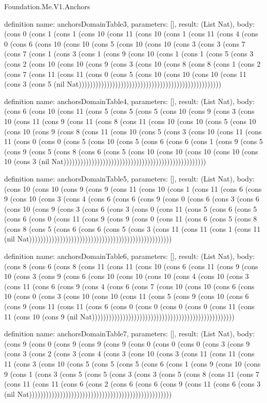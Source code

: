 \begin{lexlean}{Foundation.Me.V1.Anchors}
\begin{semanticmodule}
definition{
  name: anchorsDomainTable3,
  parameters: [],
  result: (List Nat),
  body: (cons 0 (cons 1 (cons 1 (cons 10 (cons 11 (cons 10 (cons 1 (cons 11 (cons 4 (cons 0 (cons 6 (cons 10 (cons 10 (cons 5 (cons 10 (cons 10 (cons 3 (cons 3 (cons 7 (cons 7 (cons 1 (cons 3 (cons 1 (cons 9 (cons 10 (cons 1 (cons 1 (cons 5 (cons 3 (cons 2 (cons 10 (cons 10 (cons 9 (cons 3 (cons 10 (cons 8 (cons 8 (cons 1 (cons 2 (cons 7 (cons 11 (cons 11 (cons 0 (cons 5 (cons 10 (cons 10 (cons 10 (cons 11 (cons 3 (cons 5 (nil Nat)))))))))))))))))))))))))))))))))))))))))))))))))))
}

definition{
  name: anchorsDomainTable4,
  parameters: [],
  result: (List Nat),
  body: (cons 6 (cons 10 (cons 11 (cons 5 (cons 5 (cons 5 (cons 10 (cons 9 (cons 3 (cons 10 (cons 11 (cons 9 (cons 11 (cons 8 (cons 11 (cons 10 (cons 10 (cons 5 (cons 10 (cons 10 (cons 9 (cons 8 (cons 11 (cons 10 (cons 5 (cons 3 (cons 10 (cons 11 (cons 11 (cons 0 (cons 0 (cons 5 (cons 10 (cons 5 (cons 6 (cons 6 (cons 1 (cons 9 (cons 5 (cons 9 (cons 5 (cons 8 (cons 6 (cons 5 (cons 10 (cons 10 (cons 10 (cons 10 (cons 10 (cons 3 (nil Nat)))))))))))))))))))))))))))))))))))))))))))))))))))
}

definition{
  name: anchorsDomainTable5,
  parameters: [],
  result: (List Nat),
  body: (cons 10 (cons 10 (cons 9 (cons 9 (cons 11 (cons 10 (cons 1 (cons 11 (cons 6 (cons 9 (cons 10 (cons 3 (cons 4 (cons 6 (cons 6 (cons 9 (cons 0 (cons 6 (cons 3 (cons 6 (cons 10 (cons 9 (cons 3 (cons 6 (cons 3 (cons 0 (cons 11 (cons 5 (cons 6 (cons 5 (cons 6 (cons 0 (cons 11 (cons 9 (cons 9 (cons 0 (cons 11 (cons 6 (cons 5 (cons 8 (cons 8 (cons 5 (cons 6 (cons 6 (cons 5 (cons 3 (cons 11 (cons 11 (cons 1 (cons 11 (nil Nat)))))))))))))))))))))))))))))))))))))))))))))))))))
}

definition{
  name: anchorsDomainTable6,
  parameters: [],
  result: (List Nat),
  body: (cons 8 (cons 6 (cons 8 (cons 11 (cons 11 (cons 10 (cons 6 (cons 11 (cons 9 (cons 10 (cons 3 (cons 9 (cons 6 (cons 10 (cons 10 (cons 10 (cons 4 (cons 10 (cons 3 (cons 11 (cons 6 (cons 9 (cons 4 (cons 6 (cons 7 (cons 10 (cons 10 (cons 6 (cons 10 (cons 0 (cons 3 (cons 10 (cons 10 (cons 11 (cons 5 (cons 9 (cons 10 (cons 6 (cons 9 (cons 11 (cons 11 (cons 6 (cons 0 (cons 0 (cons 0 (cons 0 (cons 11 (cons 11 (cons 10 (cons 9 (nil Nat)))))))))))))))))))))))))))))))))))))))))))))))))))
}

definition{
  name: anchorsDomainTable7,
  parameters: [],
  result: (List Nat),
  body: (cons 9 (cons 0 (cons 9 (cons 9 (cons 9 (cons 0 (cons 0 (cons 0 (cons 3 (cons 9 (cons 3 (cons 2 (cons 3 (cons 4 (cons 3 (cons 10 (cons 3 (cons 11 (cons 11 (cons 11 (cons 3 (cons 10 (cons 5 (cons 5 (cons 5 (cons 6 (cons 1 (cons 9 (cons 10 (cons 9 (cons 1 (cons 3 (cons 5 (cons 5 (cons 3 (cons 3 (cons 5 (cons 8 (cons 11 (cons 7 (cons 11 (cons 11 (cons 6 (cons 2 (cons 6 (cons 6 (cons 9 (cons 11 (cons 6 (cons 3 (nil Nat)))))))))))))))))))))))))))))))))))))))))))))))))))
}


\end{semanticmodule}
\end{lexlean}
